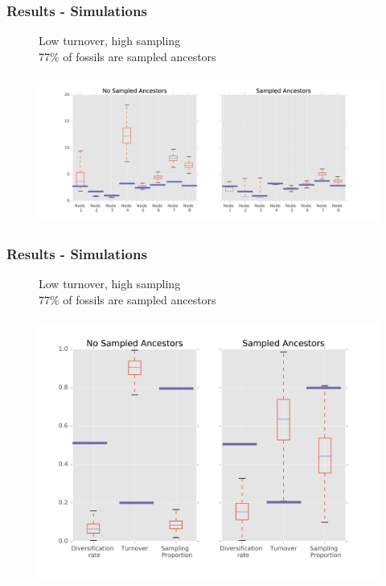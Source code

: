 \documentclass[]{beamer}
\begin{document}
\begin{frame}
\frametitle{Results -  Simulations}
\begin{center}
\begin{figure}
Low turnover, high sampling  \\
77\% of fossils are sampled ancestors \\
\boldsymbol{\lambda} \mu  \psi   \rho \\
\includegraphics[scale=0.4]{images/LowTurnHighSampnodes.png}
\end{figure}
\end{center}
\end{frame}

\begin{frame}
\frametitle{Results -  Simulations}
\begin{center}
\begin{figure}
Low turnover, high sampling  \\
77\% of fossils are sampled ancestors \\
\boldsymbol{\lambda} \mu  \psi   \rho \\
\includegraphics[scale=0.4]{images/LowTurnHighSamplog}
\end{figure}
\end{center}
\end{frame}
\end{document}
